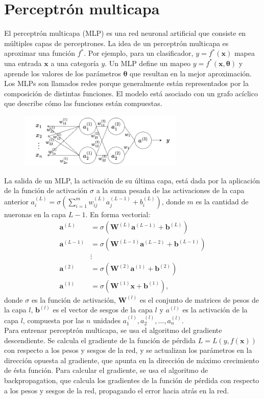 \documentclass[12pt,a4paper]{article}
\begin{document}
\section{Perceptrón multicapa}
El perceptrón multicapa (MLP) es una red neuronal artificial que consiste en múltiples capas de perceptrones. La idea de un perceptrón multicapa es aproximar una función $f^*$. Por ejemplo, para un clasificador, $y=f^*(\boldsymbol{x})$ mapea una entrada $\boldsymbol{x}$ a una categoría $y$. Un MLP define un mapeo $y=f^*(\boldsymbol{x}, \boldsymbol{\theta})$ y aprende los valores de los parámetros $\boldsymbol{\theta}$ que resultan en la mejor aproximación.
Los MLPs son llamados redes porque generalmente están representados por la composición de distintas funciones. El modelo está asociado con un grafo acíclico que describe cómo las funciones están compuestas.
\begin{figure}[H]
    \includegraphics[width=0.7\textwidth]{img/multilayer_perceptron.png}
    \centering
\end{figure}
La salida de un MLP, la activación de su última capa, está dada por la aplicación de la función de activación $\sigma$ a la suma pesada de las activaciones de la capa anterior $a^{(L)}_i = \sigma(\sum_{i=1}^m w^{(L)}_{ij} a^{(L-1)}_j + b^{(L)}_i)$, donde $m$ es la cantidad de nueronas en la capa $L-1$. En forma vectorial:
$$
\begin{aligned}
\boldsymbol{a}^{(L)} &= \sigma(\mathbf{W}^{(L)}\boldsymbol{a}^{(L-1)} + \boldsymbol{b}^{(L)})\\
\boldsymbol{a}^{(L-1)} &= \sigma(\mathbf{W}^{(L-1)}\boldsymbol{a}^{(L-2)} + \boldsymbol{b}^{(L-1)})\\
&\vdots\\
\boldsymbol{a}^{(2)} &= \sigma(\mathbf{W}^{(2)}\boldsymbol{a}^{(1)} + \boldsymbol{b}^{(2)})\\
\boldsymbol{a}^{(1)} &= \sigma(\mathbf{W}^{(1)}\boldsymbol{x} + \boldsymbol{b}^{(1)}),
\end{aligned}
$$
donde $\sigma$ es la función de activación, $\mathbf{W}^{(l)}$ es el conjunto de matrices de pesos de la capa $l$, $\boldsymbol{b}^{(l)}$ es el vector de sesgos de la capa $l$ y $a^{(l)}$ es la activación de la capa $l$, compuesta por las $n$ unidades $a^{(l)}_{1}, a^{(l)}_{2}, \dots, a^{(l)}_{n}$.\\
Para entrenar perceptrón multicapa, se usa el algoritmo del gradiente descendiente. Se calcula el gradiente de la función de pérdida $L = L(y, f(\boldsymbol{x}))$ con respecto a los pesos y sesgos de la red, y se actualizan los parámetros en la dirección opuesta al gradiente, que apunta en la dirección de máximo crecimiento de ésta función. Para calcular el gradiente, se usa el algoritmo de backpropagation, que calcula los gradientes de la función de pérdida con respecto a los pesos y sesgos de la red, propagando el error hacia atrás en la red.\\
\end{document}
